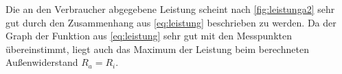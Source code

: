 Die an den Verbraucher abgegebene Leistung scheint nach \cref{fig:leistunga2} sehr gut durch den Zusammenhang aus \cref{eq:leistung} beschrieben zu werden. Da der Graph der Funktion aus \cref{eq:leistung} sehr gut mit den Messpunkten übereinstimmt, liegt auch das Maximum der Leistung beim berechneten Außenwiderstand $R_a=R_i$.
